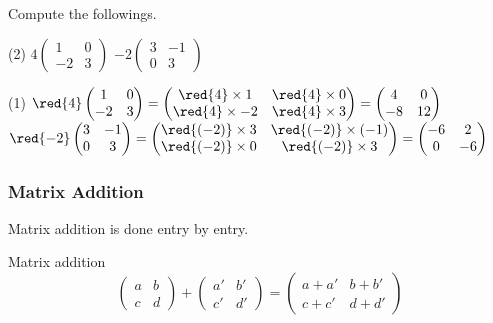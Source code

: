 \begin{frame}[t]
\begin{ex}
Compute the followings.
\begin{tasks}(2)
\task $4\begin{pmatrix} 1 & 0 \\ -2 & 3 \end{pmatrix}$
\task $-2\begin{pmatrix} 3 & -1 \\ 0 & 3 \end{pmatrix}$
\end{tasks}
\end{ex}
\begin{sol}
\begin{tasks}(1)
\task $\red{4}\begin{pmatrix} 1 & 0 \\ -2 & 3 \end{pmatrix} = \begin{pmatrix} \red{4} \times 1 & \red{4} \times 0 \\ \red{4} \times -2 & \red{4} \times 3 \end{pmatrix} = \begin{pmatrix} 4 & 0 \\ -8 & 12 \end{pmatrix}$
\task $\red{-2}\begin{pmatrix} 3 & -1 \\ 0 & 3 \end{pmatrix} = \begin{pmatrix} \red{(-2)} \times 3 & \red{(-2)} \times (-1) \\ \red{(-2)} \times 0 & \red{(-2)} \times 3 \end{pmatrix} = \begin{pmatrix} -6 & 2 \\ 0 & -6 \end{pmatrix}$
\end{tasks}
\end{sol}
\end{frame}

\begin{frame}
\frametitle{Matrix Addition}
Matrix addition is done entry by entry.
\begin{defn}{Matrix addition}{}
\begin{equation}
\begin{pmatrix} a & b \\ c & d \end{pmatrix} +  \begin{pmatrix} a' & b' \\ c' & d' \end{pmatrix} = \begin{pmatrix} a+a' & b + b' \\ c+ c' & d + d' \end{pmatrix}
\end{equation}
\end{defn}
\end{frame}


